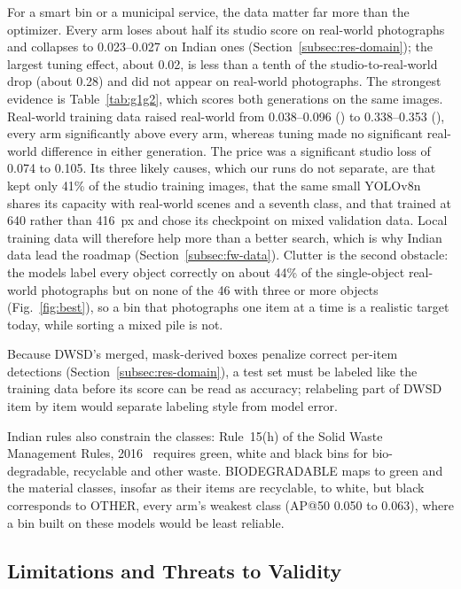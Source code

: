 For a smart bin or a municipal service, the data matter far more than the optimizer. Every arm loses about half its studio score on real-world photographs and collapses to 0.023--0.027 \mapfifty on Indian ones (Section~\ref{subsec:res-domain}); the largest tuning effect, about 0.02, is less than a tenth of the studio-to-real-world drop (about 0.28) and did not appear on real-world photographs. The strongest evidence is Table~\ref{tab:g1g2}, which scores both generations on the same images. Real-world training data raised real-world \mapfifty from 0.038--0.096 (\genone) to 0.338--0.353 (\gentwo), every \gentwo arm significantly above every \genone arm, whereas tuning made no significant real-world difference in either generation. The price was a significant studio loss of 0.074 to 0.105. Its three likely causes, which our runs do not separate, are that \gentwo kept only 41\% of the \genone studio training images, that the same small YOLOv8n shares its capacity with real-world scenes and a seventh class, and that \gentwo trained at 640 rather than 416~px and chose its checkpoint on mixed validation data. Local training data will therefore help more than a better search, which is why Indian data lead the roadmap (Section~\ref{subsec:fw-data}). Clutter is the second obstacle: the models label every object correctly on about 44\% of the single-object real-world photographs but on none of the 46 with three or more objects (Fig.~\ref{fig:best}), so a bin that photographs one item at a time is a realistic target today, while sorting a mixed pile is not.

Because DWSD's merged, mask-derived boxes penalize correct per-item detections (Section~\ref{subsec:res-domain}), a test set must be labeled like the training data before its score can be read as accuracy; relabeling part of DWSD item by item would separate labeling style from model error.

Indian rules also constrain the classes: Rule~15(h) of the Solid Waste Management Rules, 2016~\cite{moefcc2016solid} requires green, white and black bins for bio-degradable, recyclable and other waste. BIODEGRADABLE maps to green and the material classes, insofar as their items are recyclable, to white, but black corresponds to OTHER, every arm's weakest class (AP@50 0.050 to 0.063), where a bin built on these models would be least reliable.

\subsection{Limitations and Threats to Validity}
\label{subsec:limitations}

